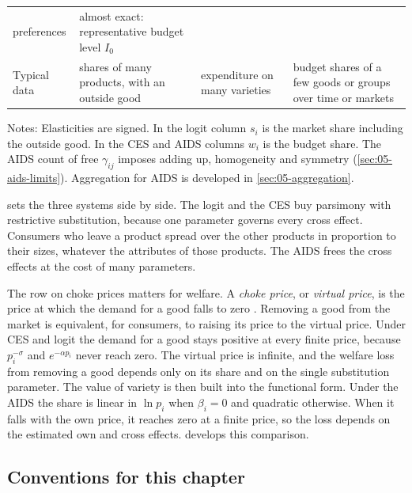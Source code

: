 \begin{table}[htbp]
\begin{tabularx}{\textwidth}{>{\raggedright\arraybackslash}p{2.55cm}
  >{\raggedright\arraybackslash}X >{\raggedright\arraybackslash}X >{\raggedright\arraybackslash}X}
  preferences & almost exact: representative budget level $I_0$ \\
\addlinespace
Typical data & shares of many products, with an outside good & expenditure on many varieties & budget
  shares of a few goods or groups over time or markets \\
\bottomrule
\end{tabularx}
\par\smallskip
\begin{minipage}{\textwidth}\footnotesize
Notes: Elasticities are signed. In the logit column $s_i$ is the market share including the outside good. In
the CES and AIDS columns $w_i$ is the budget share. The AIDS count of free $\gamma_{ij}$ imposes adding up,
homogeneity and symmetry (\cref{sec:05-aids-limits}). Aggregation for AIDS is developed in
\cref{sec:05-aggregation}.
\end{minipage}
\end{table}

 sets the three systems side by side. The logit and the CES buy parsimony with
restrictive substitution, because one parameter governs every cross effect. Consumers who leave a product
spread over the other products in proportion to their sizes, whatever the attributes of those products. The AIDS frees the cross
effects at the cost of many parameters.

The row on choke prices matters for welfare. A \emph{choke price}, or \emph{virtual price}, is the price at
which the demand for a good falls to zero \citep{Hicks1940,Rothbarth1941}. Removing a good from the market
is equivalent, for consumers, to raising its price to the virtual price. Under CES and logit the demand for
a good stays positive at every finite price, because $p_i^{-\sigma}$ and $e^{-\alpha p_i}$ never reach
zero. The virtual price is infinite, and the welfare loss from removing a good depends only on its share and
on the single substitution parameter. The value of variety is then built into the functional form. Under
the AIDS the share is linear in $\ln p_i$ when $\beta_i = 0$ and quadratic otherwise. When it falls with the
own price, it reaches zero at a finite price, so the loss depends on the estimated own and cross effects.
 develops this comparison.

\subsection{Conventions for this chapter}\label{sec:05-conventions}

